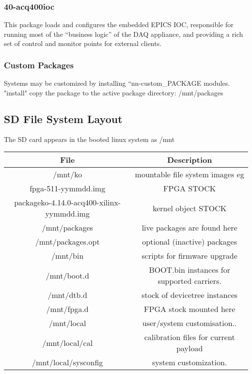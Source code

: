 \documentclass[]{article}
\begin{document}
\subsubsection{40-acq400ioc}
This package loads and configures the embedded EPICS IOC, responsible for running most of the “business logic” of the DAQ appliance, and providing a rich set of control and monitor points for external clients.

\subsubsection{Custom Packages}
Systems may be customized by installing “nn-custom_PACKAGE modules.
"install" copy the package to the active package directory: /mnt/packages

\subsection{SD File System Layout}
The SD card appears in the booted linux system as /mnt

\begin{tabular}{|c|c|}
File & Description \\
\hline\hline
/mnt/ko & mountable file system images eg  \\ 
\hline 
fpga-511-yymmdd.img & FPGA STOCK \\ 
\hline 
packageko-4.14.0-acq400-xilinx-yymmdd.img & kernel object STOCK \\ 
\hline 
/mnt/packages & live packages are found here \\ 
\hline 
/mnt/packages.opt & optional (inactive) packages \\ 
\hline 
/mnt/bin & scripts for firmware upgrade \\ 
\hline 
/mnt/boot.d & BOOT.bin instances for supported carriers. \\ 
\hline 
/mnt/dtb.d & stock of devicetree instances \\ 
\hline 
/mnt/fpga.d & FPGA stock mounted here \\ 
\hline 
/mnt/local   & user/system customisation.. \\
\hline 
/mnt/local/cal    & calibration files for current payload \\
\hline 
/mnt/local/sysconfig  &  system customization. \\
\hline 
\end{tabular} 
\end{document}
